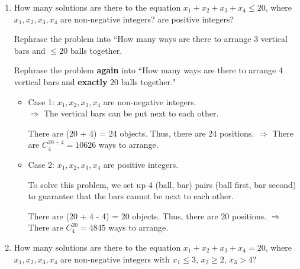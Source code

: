 \documentclass[10pt]{article}
\newcounter{problem}
\begin{document}
\begin{enumerate}
    \item How many solutions are there to the equation $x_{1} + x_{2} + x_{3} + x_{4} \leq 20$, where
    $x_{1}, x_{2}, x_{3}, x_{4}$ are non-negative integers? are positive integers?

    \par Rephrase the problem into ``How many ways are there to arrange 3 vertical bars and 
    $\leq 20$ balls together.

    \par Rephrase the problem \textbf{again} into ``How many ways are there to arrange 4 vertical bars
    and \textbf{exactly} 20 balls together."

    \begin{itemize}
        \item Case 1: $x_{1}, x_{2}, x_{3}, x_{4}$ are non-negative integers.\\
        $\Rightarrow$ The vertical bars can be put next to each other.
        \par There are (20 + 4) = 24 objects. Thus, there are 24 positions.
        $\Rightarrow$ There are $C_{4}^{20 + 4} = 10626$ ways to arrange.

        \item Case 2: $x_{1}, x_{2}, x_{3}, x_{4}$ are positive integers.\\
        \par To solve this problem, we set up 4 (ball, bar) pairs (ball first, bar second) to
        guarantee that the bars cannot be next to each other.
        \par There are (20 + 4 - 4) = 20 objects. Thus, there are 20 positions.
        $\Rightarrow$ There are $C_{4}^{20} = 4845$ ways to arrange.
    \end{itemize}

    \item How many solutions are there to the equation $x_{1} + x_{2} + x_{3} + x_{4} = 20$, where
    $x_{1}, x_{2}, x_{3}, x_{4}$ are non-negative integers with $x_{1} \leq 3$, $x_{2} \geq 2$,
    $x_{3} > 4$?


\end{enumerate}
\end{document}
